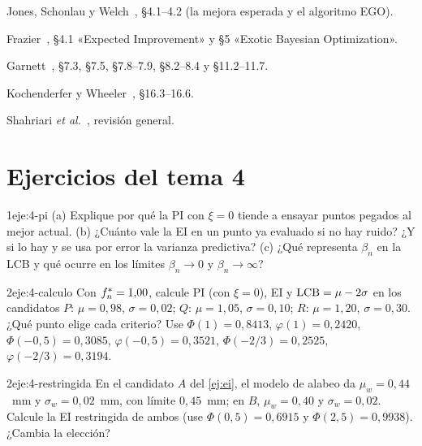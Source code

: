 \begin{lecturas}
\item Jones, Schonlau y Welch~\cite{jones}, §4.1–4.2 (la mejora esperada y el algoritmo EGO).
\item Frazier~\cite{frazier}, §4.1 «Expected Improvement» y §5 «Exotic Bayesian Optimization».
\item Garnett~\cite{garnett}, §7.3, §7.5, §7.8–7.9, §8.2–8.4 y §11.2–11.7.
\item Kochenderfer y Wheeler~\cite{kw}, §16.3–16.6.
\item Shahriari \emph{et al.}~\cite{shahriari}, revisión general.
\end{lecturas}

\section*{Ejercicios del tema 4}

\begin{ejercicio}{1}{eje:4-pi}
(a) Explique por qué la PI con $\xi=0$ tiende a ensayar puntos pegados al mejor actual. (b) ¿Cuánto vale la EI en un punto ya evaluado si no hay ruido? ¿Y si lo hay y se usa por error la varianza predictiva? (c) ¿Qué representa $\beta_n$ en la LCB y qué ocurre en los límites $\beta_n\to0$ y $\beta_n\to\infty$?
\end{ejercicio}

\begin{ejercicio}{2}{eje:4-calculo}
Con $f^{*}_{n}=1{,}00$, calcule PI (con $\xi=0$), EI y $\operatorname{LCB}=\mu-2\sigma$ en los candidatos $P$: $\mu=0{,}98$, $\sigma=0{,}02$; $Q$: $\mu=1{,}05$, $\sigma=0{,}10$; $R$: $\mu=1{,}20$, $\sigma=0{,}30$. ¿Qué punto elige cada criterio? Use $\Phi(1)=0{,}8413$, $\varphi(1)=0{,}2420$, $\Phi(-0{,}5)=0{,}3085$, $\varphi(-0{,}5)=0{,}3521$, $\Phi(-2/3)=0{,}2525$, $\varphi(-2/3)=0{,}3194$.
\end{ejercicio}

\begin{ejercicio}{2}{eje:4-restringida}
En el candidato $A$ del \cref{ej:ei}, el modelo de alabeo da $\mu_w=0{,}44$~mm y $\sigma_w=0{,}02$~mm, con límite $0{,}45$~mm; en $B$, $\mu_w=0{,}40$ y $\sigma_w=0{,}02$. Calcule la EI restringida de ambos (use $\Phi(0{,}5)=0{,}6915$ y $\Phi(2{,}5)=0{,}9938$). ¿Cambia la elección?
\end{ejercicio}

